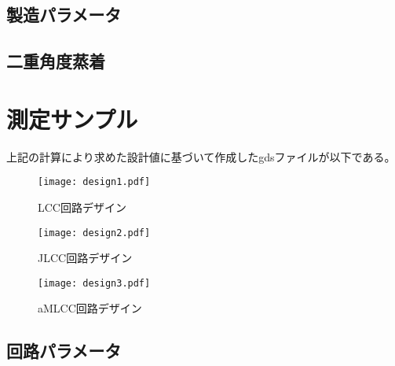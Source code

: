    \subsection{製造パラメータ}

    \subsection{二重角度蒸着}

\section{測定サンプル}
    上記の計算により求めた設計値に基づいて作成したgdsファイルが以下である。
    \begin{figure}[H]
        \centering
        \texttt{[image: design1.pdf]}
        \caption{LCC回路デザイン}
    \end{figure}

    \begin{figure}[H]
        \centering
        \texttt{[image: design2.pdf]}
        \caption{JLCC回路デザイン}
    \end{figure}

    \begin{figure}[H]
        \centering
        \texttt{[image: design3.pdf]}
        \caption{aMLCC回路デザイン}
    \end{figure}
    \subsection{回路パラメータ}
